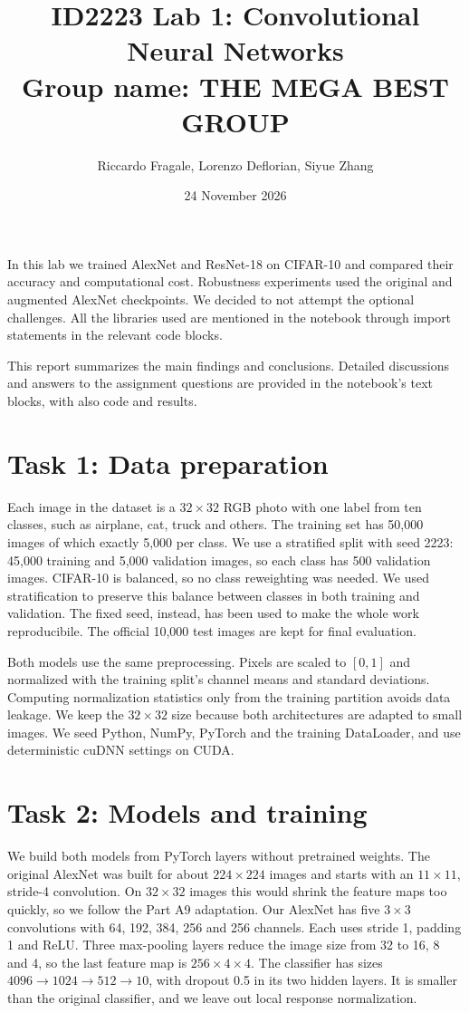 \documentclass[11pt,a4paper]{article}
\title{ID2223 Lab 1: Convolutional Neural Networks\\[0.5em]\large Group name: THE MEGA BEST GROUP}
\author{Riccardo Fragale, Lorenzo Deflorian, Siyue Zhang}
\date{24 November 2026}
\begin{document}
\maketitle

In this lab we trained AlexNet and ResNet-18 on CIFAR-10 and compared their accuracy and computational cost. 
Robustness experiments used the original and augmented AlexNet checkpoints. 
We decided to not attempt the optional challenges. 
All the libraries used are mentioned in the notebook through import statements in the relevant code blocks.

This report summarizes the main findings and conclusions. Detailed discussions and answers to the assignment questions are provided in the notebook's text blocks, with also code and results.

\section{Task 1: Data preparation}
Each image in the dataset is a $32\times32$ RGB photo with one label from ten classes, such as airplane, cat, truck and others. The training set has 50,000 images of which exactly 5,000 per class. 
We use a stratified split with seed 2223: 45,000 training and 5,000 validation images, so each class has 500 validation images. 
CIFAR-10 is balanced, so no class reweighting was needed. 
We used stratification to preserve this balance between classes in both training and validation.
The fixed seed, instead, has been used to make the whole work reproducibile.
The official 10,000 test images are kept for final evaluation.

Both models use the same preprocessing. Pixels are scaled to $[0,1]$ and normalized with the training split's channel means and standard deviations. Computing normalization statistics only from the training partition avoids data leakage.
We keep the $32\times32$ size because both architectures are adapted to small images. We seed Python, NumPy, PyTorch and the training DataLoader, and use deterministic cuDNN settings on CUDA.

\section{Task 2: Models and training}
We build both models from PyTorch layers without pretrained weights. 
The original AlexNet was built for about $224\times224$ images and starts with an $11\times11$, stride-4 convolution.
On $32\times32$ images this would shrink the feature maps too quickly, so we follow the Part A9 adaptation. 
Our AlexNet has five $3\times3$ convolutions with 64, 192, 384, 256 and 256 channels. Each uses stride 1, padding 1 and ReLU. 
Three max-pooling layers reduce the image size from 32 to 16, 8 and 4, so the last feature map is $256\times4\times4$. 
The classifier has sizes $4096\rightarrow1024\rightarrow512\rightarrow10$, with dropout 0.5 in its two hidden layers.
It is smaller than the original classifier, and we leave out local response normalization.
\end{document}

